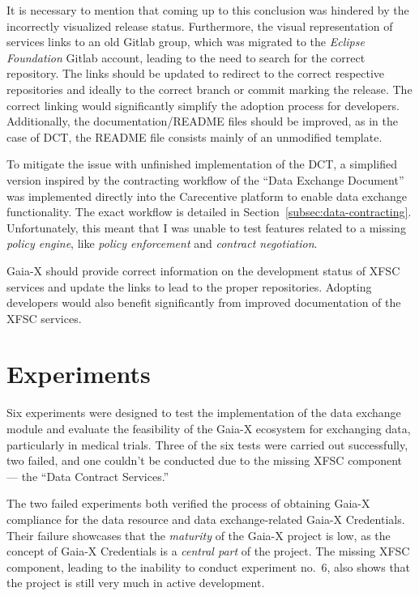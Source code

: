 It is necessary to mention that coming up to this conclusion was hindered by the incorrectly visualized release status.
Furthermore, the visual representation of services links to an old Gitlab group, which was migrated to the \textit{Eclipse Foundation} Gitlab account, leading to the need to search for the correct repository.
The links should be updated to redirect to the correct respective repositories and ideally to the correct branch or commit marking the release.
The correct linking would significantly simplify the adoption process for developers.
Additionally, the documentation/README files should be improved, as in the case of DCT, the README file consists mainly of an unmodified template.

To mitigate the issue with unfinished implementation of the DCT, a simplified version inspired by the contracting workflow of the ``Data Exchange Document''~\cite{gaiax_data_exchange_document} was implemented directly into the Carecentive platform to enable data exchange functionality.
The exact workflow is detailed in Section~\ref{subsec:data-contracting}.
Unfortunately, this meant that I was unable to test features related to a missing \textit{policy engine}, like \textit{policy enforcement} and \textit{contract negotiation}.

Gaia-X should provide correct information on the development status of XFSC services and update the links to lead to the proper repositories.
Adopting developers would also benefit significantly from improved documentation of the XFSC services.

\section{Experiments}\label{sec:experiments_discussion}

Six experiments were designed to test the implementation of the data exchange module and evaluate the feasibility of the Gaia-X ecosystem for exchanging data, particularly in medical trials.
Three of the six tests were carried out successfully, two failed, and one couldn't be conducted due to the missing XFSC component --- the ``Data Contract Services.''

The two failed experiments both verified the process of obtaining Gaia-X compliance for the data resource and data exchange-related Gaia-X Credentials.
Their failure showcases that the \textit{maturity} of the Gaia-X project is low, as the concept of Gaia-X Credentials is a \textit{central part} of the project.
The missing XFSC component, leading to the inability to conduct experiment no.~6, also shows that the project is still very much in active development.

